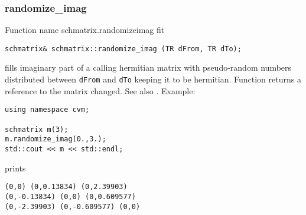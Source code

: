 \subsubsection{randomize\_imag}
Function%
\pdfdest name {schmatrix.randomizeimag} fit
\begin{verbatim}
schmatrix& schmatrix::randomize_imag (TR dFrom, TR dTo);
\end{verbatim}
fills  imaginary part of a calling hermitian matrix with 
pseudo-random numbers distributed between
\verb"dFrom" and \verb"dTo" keeping it to be hermitian.
Function
returns a reference to the matrix changed.
See also
.
Example:
\begin{Verbatim}
using namespace cvm;

schmatrix m(3);
m.randomize_imag(0.,3.);
std::cout << m << std::endl;
\end{Verbatim}
prints
\begin{Verbatim}
(0,0) (0,0.13834) (0,2.39903)
(0,-0.13834) (0,0) (0,0.609577)
(0,-2.39903) (0,-0.609577) (0,0)
\end{Verbatim}
\newpage

